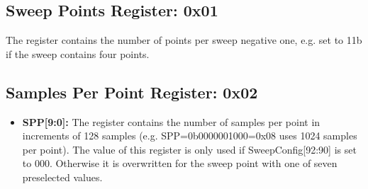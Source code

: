 \documentclass{article}
\newcommand{\bitrect}[2]{
  \begin{pgfonlayer}{foreground}
    \draw [thick] (0,0) rectangle (#1,1);
    \pgfmathsetmacro\result{#1-1}
    \foreach \x in {1,...,\result}
      \draw [thick] (\x,1) -- (\x, 0.8);
  \end{pgfonlayer}
  \bitlabels{#1}{#2}
}
\newcommand{\rwbits}[3]{
  \draw [thick] (#1,0) rectangle ++(#2,1) node[pos=0.5]{#3};
  \pgfmathsetmacro\start{#1+0.5}
  \pgfmathsetmacro\finish{#1+#2-0.5}
}
\newcommand{\robits}[3]{
  \begin{pgfonlayer}{background}
    \draw [thick, fill=lightgray] (#1,0) rectangle ++(#2,1) node[pos=0.5]{#3};
  \end{pgfonlayer}
  \pgfmathsetmacro\start{#1+0.5}
  \pgfmathsetmacro\finish{#1+#2-0.5}
}
\newcommand{\bitlabels}[2]{
  \foreach \bit in {1,...,#1}{
     \pgfmathsetmacro\result{#2}
     \node [above] at (\bit-0.5, 1) {\pgfmathprintnumber{\result}};
   }
}
\begin{document}
\subsection{Sweep Points Register: 0x01}
\begin{center}
\end{center}
The register contains the number of points per sweep negative one, e.g. set to 11b if the sweep contains four points.

\subsection{Samples Per Point Register: 0x02}
\begin{center}
\end{center}
\begin{itemize}
\item \textbf{SPP[9:0]:} The register contains the number of samples per point in increments of 128 samples (e.g. SPP=0b0000001000=0x08 uses 1024 samples per point). The value of this register is only used if SweepConfig[92:90] is set to 000. Otherwise it is overwritten for the sweep point with one of seven preselected values.
\end{itemize}
\end{document}
